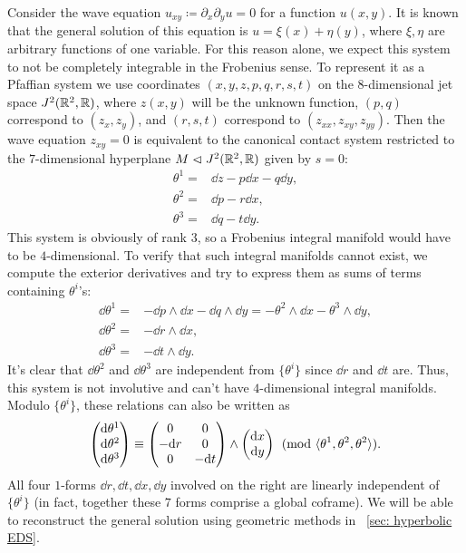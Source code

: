 \begin{example}
    Consider the wave equation $u_{xy}\coloneqq \partial_x\partial_yu=0$ for a function $u(x,y)$. It is known that the general solution of this equation is $u=\xi(x)+\eta(y)$, where $\xi,\eta$ are arbitrary functions of one variable. For this reason alone, we expect this system to not be completely integrable in the Frobenius sense. To represent it as a Pfaffian system we use coordinates $(x,y,z,p,q,r,s,t)$ on the $8$-dimensional jet space $J^2(\mathbb{R}^2,\mathbb{R})$, where $z(x,y)$ will be the unknown function, $(p,q)$ correspond to $(z_x,z_y)$, and $(r,s,t)$ correspond to $(z_{xx},z_{xy},z_{yy})$. Then the wave equation $z_{xy}=0$ is equivalent to the canonical contact system restricted to the $7$-dimensional hyperplane $M\vartriangleleft J^2(\mathbb{R}^2,\mathbb{R})$ given by $s=0$:
    \begin{align}
        \theta^1=& \dd z-p\dd x-q\dd y,\\
        \theta^2=& \dd p- r\dd x,\\
        \theta^3=& \dd q- t\dd y.
    \end{align}
    This system is obviously of rank $3$, so a Frobenius integral manifold would have to be $4$-dimensional. To verify that such integral manifolds cannot exist, we compute the exterior derivatives and try to express them as sums of terms containing $\theta^i$'s:
    \begin{align}
        \dd\theta^1=&-\dd p\wedge \dd x-\dd q\wedge\dd y=-\theta^2\wedge\dd x-\theta^3\wedge \dd y,\\
        \dd\theta^2=&-\dd r\wedge\dd x,\\
        \dd\theta^3=&-\dd t\wedge \dd y.
    \end{align}
    It's clear that $\dd\theta^2$ and $\dd\theta^3$ are independent from $\{\theta^i\}$ since $\dd r$ and $\dd t$ are. Thus, this system is not involutive and can't have $4$-dimensional integral manifolds. Modulo $\{\theta^i\}$, these relations can also be written as 
    \[
        \begin{pmatrix}
            {\mathrm{d}}\theta^1\\
            {\mathrm{d}}\theta^2\\
            {\mathrm{d}}\theta^3
        \end{pmatrix}\equiv
        \begin{pmatrix}
            0 & 0 \\
            -{\mathrm{d}} r & 0\\
            0 & -{\mathrm{d}} t
        \end{pmatrix}\wedge
        \begin{pmatrix}
            {\mathrm{d}} x\\
            {\mathrm{d}} y
        \end{pmatrix} \pmod{\langle\theta^1,\theta^2,\theta^2\rangle}.
    \]
    All four $1$-forms $\dd r,\dd t,\dd x,\dd y$ involved on the right are linearly independent of $\{\theta^i\}$ (in fact, together these $7$ forms comprise a global coframe). We will be able to reconstruct the general solution using geometric methods in \Subsect~\ref{sec: hyperbolic EDS}.
\end{example}


